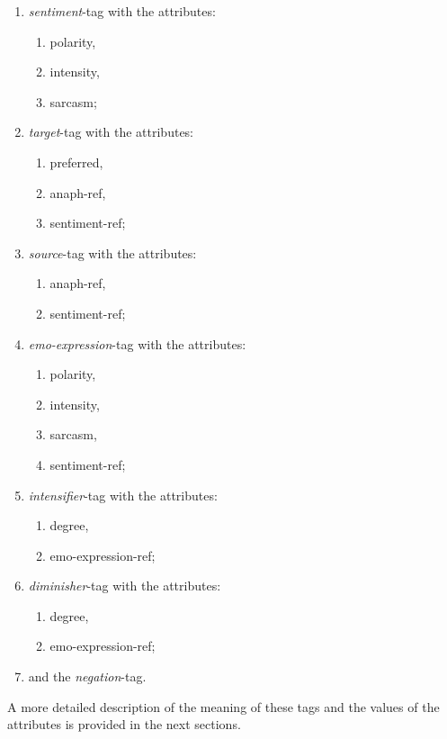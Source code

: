 \documentclass[11pt,a4paper]{article}
\begin{document}
\begin{multicols}{2}
  \begin{enumerate}
  \item \textit{sentiment}-tag with the attributes:
    \begin{enumerate}
    \item polarity,
    \item intensity,
    \item sarcasm;
    \end{enumerate}
  \item \textit{target}-tag with the attributes:
    \begin{enumerate}
    \item preferred,
    \item anaph-ref,
    \item sentiment-ref;
    \end{enumerate}
  \item \textit{source}-tag with the attributes:
    \begin{enumerate}
    \item anaph-ref,
    \item sentiment-ref;
    \end{enumerate}
  \item \textit{emo-expression}-tag with the attributes:
    \begin{enumerate}
    \item polarity,
    \item intensity,
    \item sarcasm,
    \item sentiment-ref;
    \end{enumerate}
  \item \textit{intensifier}-tag with the attributes:
    \begin{enumerate}
    \item degree,
    \item emo-expression-ref;
    \end{enumerate}
  \item \textit{diminisher}-tag with the attributes:
    \begin{enumerate}
    \item degree,
    \item emo-expression-ref;
    \end{enumerate}
  \item and the \textit{negation}-tag.
  \end{enumerate}
\end{multicols}
A more detailed description of the meaning of these tags and the values of the
attributes is provided in the next sections.
\end{document}
